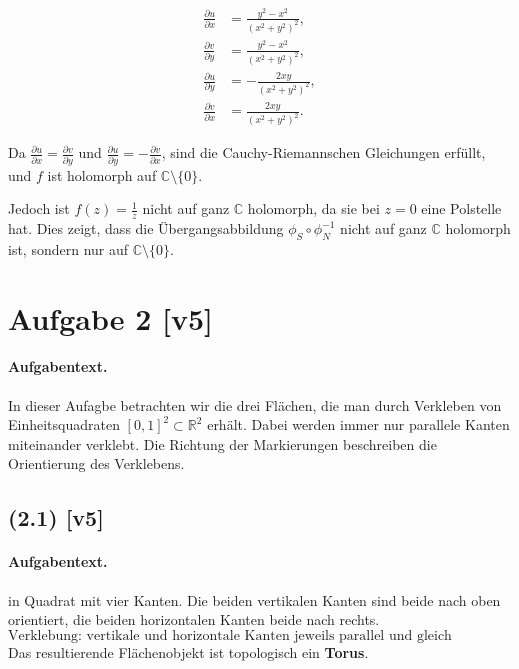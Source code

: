 \documentclass[11pt,a4paper]{article}
\begin{document}
\begin{align*}
\frac{\partial u}{\partial x} &= \frac{y^2 - x^2}{(x^2 + y^2)^2}, \\
\frac{\partial v}{\partial y} &= \frac{y^2 - x^2}{(x^2 + y^2)^2}, \\
\frac{\partial u}{\partial y} &= -\frac{2xy}{(x^2 + y^2)^2}, \\
\frac{\partial v}{\partial x} &= \frac{2xy}{(x^2 + y^2)^2}.
\end{align*}

Da $\frac{\partial u}{\partial x} = \frac{\partial v}{\partial y}$ und $\frac{\partial u}{\partial y} = -\frac{\partial v}{\partial x}$, sind die Cauchy-Riemannschen Gleichungen erfüllt, und $f$ ist holomorph auf $\mathbb{C} \setminus \{0\}$.

Jedoch ist $f(z) = \frac{1}{z}$ nicht auf ganz $\mathbb{C}$ holomorph, da sie bei $z=0$ eine Polstelle hat. Dies zeigt, dass die Übergangsabbildung $\phi_S \circ \phi_N^{-1}$ nicht auf ganz $\mathbb{C}$ holomorph ist, sondern nur auf $\mathbb{C} \setminus \{0\}$.


\section*{Aufgabe 2 [v5]}
\paragraph{Aufgabentext.}
In dieser Aufagbe betrachten wir die drei Flächen, die man durch Verkleben von Einheitsquadraten $[0,1]^2 \subset \mathbb{R}^2$ erhält. Dabei werden immer nur parallele Kanten miteinander verklebt. Die Richtung der Markierungen beschreiben die Orientierung des Verklebens.

\subsection*{(2.1) [v5]}
\paragraph{Aufgabentext.}
in Quadrat mit vier Kanten. 
Die beiden vertikalen Kanten sind beide nach oben orientiert, 
die beiden horizontalen Kanten beide nach rechts.  
\[
\text{Verklebung: vertikale und horizontale Kanten jeweils parallel und gleich orientiert.}
\]
Das resultierende Flächenobjekt ist topologisch ein \textbf{Torus}.
\end{document}
